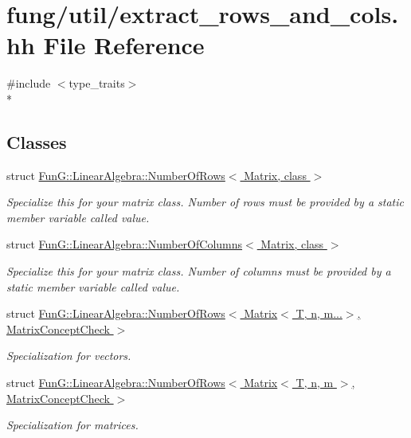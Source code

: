 \hypertarget{extract__rows__and__cols_8hh}{}\section{fung/util/extract\+\_\+rows\+\_\+and\+\_\+cols.hh File Reference}
\label{extract__rows__and__cols_8hh}
{\ttfamily \#include $<$type\+\_\+traits$>$}\\*
\subsection*{Classes}
\begin{DoxyCompactItemize}
\item 
struct \hyperlink{structFunG_1_1LinearAlgebra_1_1NumberOfRows}{Fun\+G\+::\+Linear\+Algebra\+::\+Number\+Of\+Rows$<$ Matrix, class $>$}
\begin{DoxyCompactList}\small\item\em Specialize this for your matrix class. Number of rows must be provided by a static member variable called value. \end{DoxyCompactList}\item 
struct \hyperlink{structFunG_1_1LinearAlgebra_1_1NumberOfColumns}{Fun\+G\+::\+Linear\+Algebra\+::\+Number\+Of\+Columns$<$ Matrix, class $>$}
\begin{DoxyCompactList}\small\item\em Specialize this for your matrix class. Number of columns must be provided by a static member variable called value. \end{DoxyCompactList}\item 
struct \hyperlink{structFunG_1_1LinearAlgebra_1_1NumberOfRows_3_01Matrix_3_01T_00_01n_00_01m_8_8_8_4_00_01MatrixConceptCheck_01_4}{Fun\+G\+::\+Linear\+Algebra\+::\+Number\+Of\+Rows$<$ Matrix$<$ T, n, m...$>$, Matrix\+Concept\+Check $>$}
\begin{DoxyCompactList}\small\item\em Specialization for vectors. \end{DoxyCompactList}\item 
struct \hyperlink{structFunG_1_1LinearAlgebra_1_1NumberOfRows_3_01Matrix_3_01T_00_01n_00_01m_01_4_00_01MatrixConceptCheck_01_4}{Fun\+G\+::\+Linear\+Algebra\+::\+Number\+Of\+Rows$<$ Matrix$<$ T, n, m $>$, Matrix\+Concept\+Check $>$}
\begin{DoxyCompactList}\small\item\em Specialization for matrices. \end{DoxyCompactList}\item 

\end{DoxyCompactItemize}
